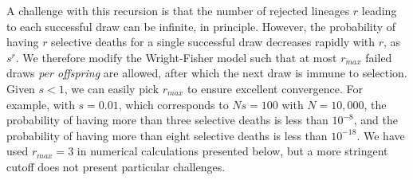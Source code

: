 \documentclass[9pt,twocolumn,twoside,lineno]{gsajnl}
\newcommand{\Coalc}[4]{\left(#1, #2 ; #3, #4 \right)}
\begin{document}

A challenge with this recursion is that the number of rejected lineages $r$ leading to each successful
draw can be infinite, in principle.
 However, the probability of having $r$ selective deaths for a single successful draw decreases
rapidly with $r$, as $s^r.$ We therefore modify the Wright-Fisher model such that at most $r_{max}$ failed
draws \emph{per offspring} are allowed, after which the next draw is immune to selection. Given
$s<1$, we can easily pick $r_{max}$ to ensure excellent convergence. For example, with $s=0.01$,
which corresponds to $Ns=100$ with $N=10,000$, the probability of having more than
three selective deaths is less than $10^{-8}$, and the probability of having more than eight selective deaths is
less than $10^{-18}.$ We have used $r_{max}=3$ in numerical calculations presented below, but a 
more stringent cutoff does not present particular challenges.
\end{document}
